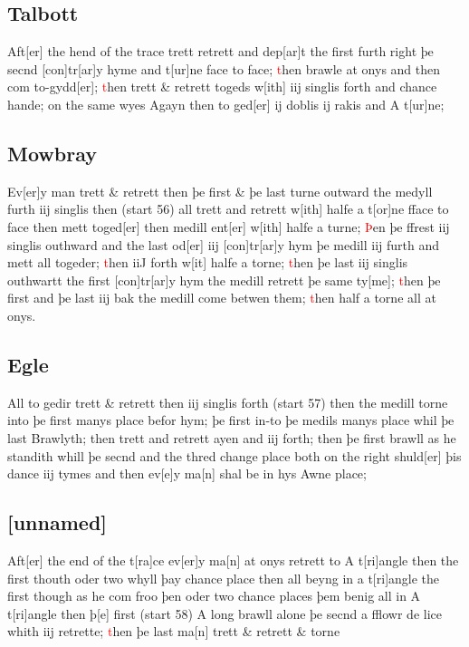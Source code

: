\documentclass[12pt,letter]{article} %
\newcommand{\red}[1]{\textcolor{red}{#1}}
\newcommand{\srcpg}[1]{(start #1)}
\begin{document}
    \subsection{Talbott}
Aft{[}er{]} the hend of the trace trett retrett and 
dep{[}ar{]}t the first furth right þe secnd {[}con{]}tr{[}ar{]}y 
hyme and t{[}ur{]}ne face to face; \red{t}hen brawle at onys 
and then com to-gydd{[}er{]}; \red{t}hen trett \& retrett 
togeds w{[}ith{]} iij singlis forth and chance hande; on 
the same wyes Agayn then to ged{[}er{]} ij doblis ij 
rakis and A t{[}ur{]}ne;

\subsection{Mowbray}
Ev{[}er{]}y man trett \& retrett then þe first \& þe last turne outward
the medyll furth iij singlis then \srcpg{56} all trett and retrett
w{[}ith{]} halfe a t{[}or{]}ne fface to face then mett toged{[}er{]}
then medill ent{[}er{]} w{[}ith{]} halfe a turne; \red{Þ}en þe  ffrest iij
singlis outhward and the last od{[}er{]} iij {[}con{]}tr{[}ar{]}y hym þe
medill iij furth and mett all togeder; \red{t}hen iiJ forth w{[}it{]} halfe a
torne; \red{t}hen þe last iij singlis outhwartt the first {[}con{]}tr{[}ar{]}y
hym the medill retrett þe same ty{[}me{]}; \red{t}hen þe first and þe last iij
bak the medill come betwen them; \red{t}hen half a torne all at onys.

\subsection{Egle}
All to gedir trett \& retrett then iij singlis forth \srcpg{57} then the
medill torne into þe first manys place befor hym; þe first in-to þe
medils manys place whil þe last Brawlyth; then trett and retrett ayen
and iij forth; then þe first brawll as he standith whill þe secnd and
the thred change place both on the right shuld{[}er{]} þis dance iij
tymes and then ev{[}e{]}y ma{[}n{]} shal be in hys Awne place;

\subsection{{[}unnamed{]}}
Aft{[}er{]} the end of the t{[}ra{]}ce ev{[}er{]}y ma{[}n{]} at
onys retrett to A t{[}ri{]}angle then the first thouth oder two whyll
þay chance place then all beyng in a t{[}ri{]}angle the first though as
he com froo þen oder two chance places þem benig all in A t{[}ri{]}angle
then þ{[}e{]} first \srcpg{58} A long brawll alone þe secnd a fflowr de
lice whith iij retrette; \red{t}hen þe last ma{[}n{]} trett \& retrett \&
torne
\end{document}
